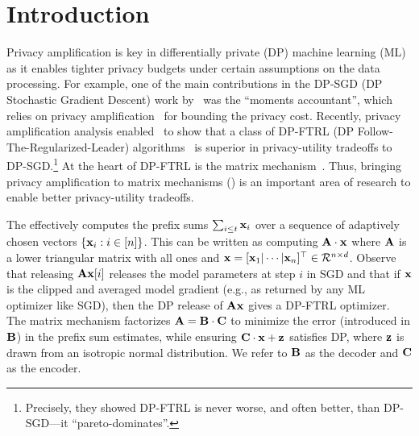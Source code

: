 \section{Introduction}
Privacy amplification is key in differentially private (DP) machine learning (ML) as it enables tighter privacy budgets under certain assumptions on the data processing.
For example, one of the main contributions in the DP-SGD (DP Stochastic Gradient Descent) work by~\citet{abadi2016deep} was the ``moments accountant'', which relies on privacy amplification~\citep{KLNRS,BST14} for bounding the privacy cost. Recently, privacy amplification analysis enabled~\citet{BandedMF} to show that a class of DP-FTRL (DP Follow-The-Regularized-Leader) algorithms~\citep{thakurta2013nearly,kairouz2021practical, MEMF} is superior in privacy-utility tradeoffs to DP-SGD.\footnote{Precisely, they showed DP-FTRL is never worse, and often better, than DP-SGD---it ``pareto-dominates''.}
At the heart of DP-FTRL is the matrix mechanism~\citep{mckenna2021hdmm,denisovDPMF}. Thus, bringing privacy amplification to matrix mechanisms (\mms) is an important area of research to enable better privacy-utility tradeoffs.

The \mm effectively computes the prefix sums $\sum_{i\leq t} \mathbf{x}_i$ over a sequence of adaptively chosen vectors $\{\mathbf{x}_i:i\in[n]\}$. This can be written as computing $\mathbf{A}\cdot\mathbf{x}$ where $\mathbf{A}$ is a lower triangular matrix with all ones and $\mathbf{x}=[\mathbf{x}_1|\cdots|\mathbf{x}_n]^\top\in\mathcal{R}^{n\times d}$. Observe that
releasing $\mathbf{A}\mathbf{x}[i]$ releases the model parameters at step $i$ in SGD and that if $\mathbf{x}$ is the clipped and averaged model gradient (e.g., as returned by any ML optimizer like SGD), then the DP release of $\mathbf{A}\mathbf{x}$ gives a DP-FTRL optimizer.
%
The matrix mechanism factorizes $\mathbf{A}=\mathbf{B}\cdot\mathbf{C}$ to minimize the error (introduced in $\mathbf{B}$) in the prefix sum estimates, while ensuring $\mathbf{C}\cdot \mathbf{x} +\mathbf{z}$ satisfies DP, where $\mathbf{z}$ is drawn from an isotropic normal distribution. We refer to $\mathbf{B}$ as the decoder and $\mathbf{C}$ as the encoder.

